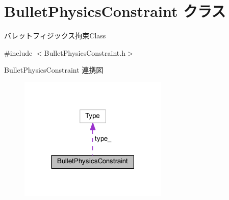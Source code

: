 \hypertarget{class_bullet_physics_constraint}{}\section{Bullet\+Physics\+Constraint クラス}
\label{class_bullet_physics_constraint}


バレットフィジックス拘束\+Class  




{\ttfamily \#include $<$Bullet\+Physics\+Constraint.\+h$>$}



Bullet\+Physics\+Constraint 連携図\nopagebreak
\begin{figure}[H]
\begin{center}
\leavevmode
\includegraphics[width=201pt]{class_bullet_physics_constraint__coll__graph}
\end{center}
\end{figure}
